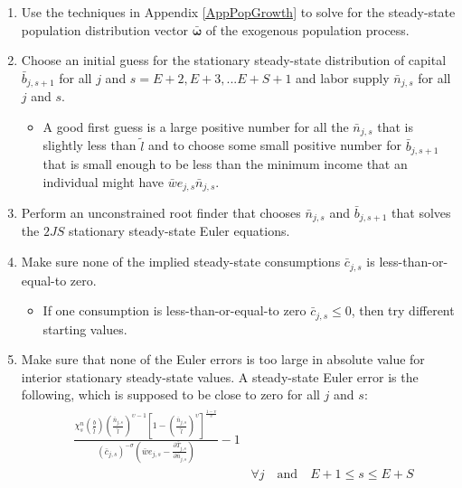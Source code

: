 \documentclass[letterpaper,12pt]{article}
\theoremstyle{definition}
\begin{document}
  \begin{enumerate}
    \item Use the techniques in Appendix \ref{AppPopGrowth} to solve for the steady-state population distribution vector $\bm{\bar{\omega}}$ of the exogenous population process.
    \item Choose an initial guess for the stationary steady-state distribution of capital $\bar{b}_{j,s+1}$ for all $j$ and $s=E+2,E+3,...E+S+1$ and labor supply $\bar{n}_{j,s}$ for all $j$ and $s$.
      \begin{itemize}
        \item A good first guess is a large positive number for all the $\bar{n}_{j,s}$ that is slightly less than $\tilde{l}$ and to choose some small positive number for $\bar{b}_{j,s+1}$ that is small enough to be less than the minimum income that an individual might have $\bar{w}e_{j,s}\bar{n}_{j,s}$.
      \end{itemize}
    \item Perform an unconstrained root finder that chooses $\bar{n}_{j,s}$ and $\bar{b}_{j,s+1}$ that solves the $2JS$ stationary steady-state Euler equations.
    \item Make sure none of the implied steady-state consumptions $\bar{c}_{j,s}$ is less-than-or-equal-to zero.
      \begin{itemize}
        \item If one consumption is less-than-or-equal-to zero $\bar{c}_{j,s}\leq 0$, then try different starting values.
      \end{itemize}
    \item Make sure that none of the Euler errors is too large in absolute value for interior stationary steady-state values. A steady-state Euler error is the following, which is supposed to be close to zero for all $j$ and $s$:
      \begin{align}
        \begin{split}
          &\frac{\chi^n_{s}\left(\frac{b}{\tilde{l}}\right)\left(\frac{\bar{n}_{j,s}}{\tilde{l}}\right)^{\upsilon-1}\left[1 - \left(\frac{\bar{n}_{j,s}}{\tilde{l}}\right)^\upsilon\right]^{\frac{1-\upsilon}{\upsilon}}}{(\bar{c}_{j,s})^{-\sigma}\left(\bar{w} e_{j,s} - \frac{\partial\bar{T}_{j,s}}{\partial \bar{n}_{j,s}}\right)} - 1 \\
          &\qquad\qquad\qquad\qquad\qquad\qquad\qquad\forall j\quad\text{and}\quad E+1\leq s\leq E+S
        \end{split} \label{EqSSeulerrLab} \\

\end{align}
\end{enumerate}
\end{document}
